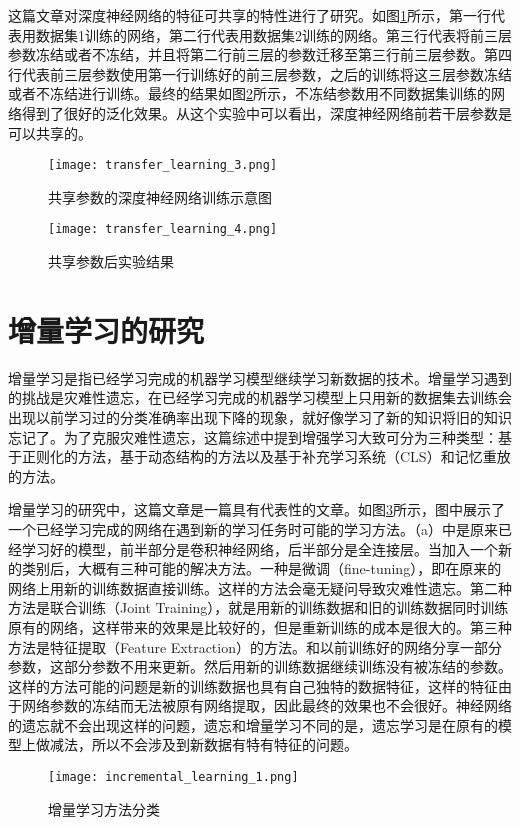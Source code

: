 这篇文章\cite{yosinski_2014_NIPS}对深度神经网络的特征可共享的特性进行了研究。如图\ref{fig:transfer_learning_3}所示，第一行代表用数据集1训练的网络，第二行代表用数据集2训练的网络。第三行代表将前三层参数冻结或者不冻结，并且将第二行前三层的参数迁移至第三行前三层参数。第四行代表前三层参数使用第一行训练好的前三层参数，之后的训练将这三层参数冻结或者不冻结进行训练。最终的结果如图\ref{fig:transfer_learning_4}所示，不冻结参数用不同数据集训练的网络得到了很好的泛化效果。从这个实验中可以看出，深度神经网络前若干层参数是可以共享的。
\begin{figure}
    \centering
    \texttt{[image: transfer\_learning\_3.png]}
    \caption{共享参数的深度神经网络训练示意图\cite{yosinski_2014_NIPS}}
    \label{fig:transfer_learning_3}
\end{figure}
\begin{figure}
    \centering
    \texttt{[image: transfer\_learning\_4.png]}
    \caption{共享参数后实验结果\cite{yosinski_2014_NIPS}}
    \label{fig:transfer_learning_4}
\end{figure}

\section{增量学习的研究}
增量学习是指已经学习完成的机器学习模型继续学习新数据的技术。增量学习遇到的挑战是灾难性遗忘，在已经学习完成的机器学习模型上只用新的数据集去训练会出现以前学习过的分类准确率出现下降的现象，就好像学习了新的知识将旧的知识忘记了。为了克服灾难性遗忘，这篇综述\cite{PARISI201954}中提到增强学习大致可分为三种类型：基于正则化的方法，基于动态结构的方法以及基于补充学习系统（CLS）和记忆重放的方法。

增量学习的研究中，这篇文章\cite{8107520}是一篇具有代表性的文章。如图\ref{fig:incremental_learning_1}所示，图中展示了一个已经学习完成的网络在遇到新的学习任务时可能的学习方法。（a）中是原来已经学习好的模型，前半部分是卷积神经网络，后半部分是全连接层。当加入一个新的类别后，大概有三种可能的解决方法。一种是微调（fine-tuning），即在原来的网络上用新的训练数据直接训练。这样的方法会毫无疑问导致灾难性遗忘。第二种方法是联合训练（Joint Training），就是用新的训练数据和旧的训练数据同时训练原有的网络，这样带来的效果是比较好的，但是重新训练的成本是很大的。第三种方法是特征提取（Feature Extraction）的方法。和以前训练好的网络分享一部分参数，这部分参数不用来更新。然后用新的训练数据继续训练没有被冻结的参数。这样的方法可能的问题是新的训练数据也具有自己独特的数据特征，这样的特征由于网络参数的冻结而无法被原有网络提取，因此最终的效果也不会很好。神经网络的遗忘就不会出现这样的问题，遗忘和增量学习不同的是，遗忘学习是在原有的模型上做减法，所以不会涉及到新数据有特有特征的问题。
\begin{figure}
    \centering
    \texttt{[image: incremental\_learning\_1.png]}
    \caption{增量学习方法分类\cite{8107520}}
    \label{fig:incremental_learning_1}
\end{figure}

